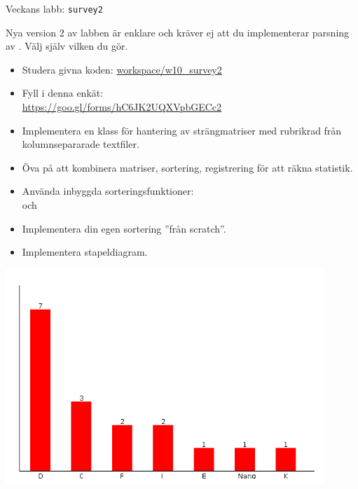 



\begin{Slide}{Veckans labb: \texttt{survey2}}\SlideFontTiny
\begin{minipage}{0.65\textwidth}
Nya version 2 av labben är enklare och kräver ej att du implementerar parsning av . Välj själv vilken du gör.

\vspace{0.5em}
\begin{itemize}
\item Studera givna koden: {\SlideFontTiny \href{https://github.com/lunduniversity/introprog/tree/master/workspace/w10_survey2/src/main/scala/stats}{workspace/w10\_survey2}}
\item Fyll i denna enkät:
\\{\SlideFontTiny \url{https://goo.gl/forms/hC6JK2UQXVpbGECc2}} 
\end{itemize}

\begin{itemize}
\item Implementera en klass  för hantering av strängmatriser med rubrikrad från kolumnsepararade textfiler.
\item Öva på att kombinera matriser, sortering, registrering för att räkna statistik.
\item Använda inbyggda sorteringsfunktioner: \\ och 
\item Implementera din egen sortering ''från scratch''.
\end{itemize}
\begin{itemize}
\item Implementera stapeldiagram.
\end{itemize}
\end{minipage}
\hfill\begin{minipage}{0.27\textwidth}
\centering
\includegraphics[width=0.9\textwidth]{../img/survey/bar}


\end{minipage}
\end{Slide}
